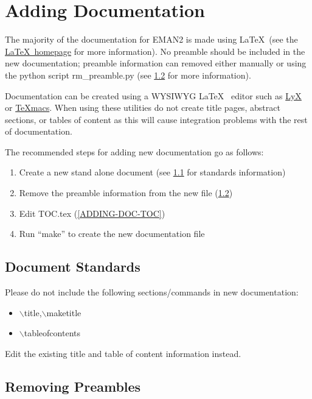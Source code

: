 \section{Adding Documentation} 

The majority of the documentation for EMAN2 is made using \LaTeX ~(see the
\href{http://www.latex-project.org/}{\LaTeX ~homepage} for more
information).  No preamble should be included in the new
documentation; preamble information can removed either manually or
using the python script rm\_preamble.py (see \ref{ADDING-DOC-RMPRE}
for more information).  

Documentation can be created using a WYSIWYG \LaTeX ~ editor such as
\href{http://www.lyx.org/}{LyX} or
\href{http://www.www.texmacs.org/}{TeXmacs}.  When using these
utilities do not create title pages, abstract sections, or tables of
content as this will cause integration problems with the rest of
documentation.

The recommended steps for adding new documentation go as follows:
\begin{enumerate}
  \item Create a new stand alone document (see \ref{ADDING-DOC-STANDS}
  for standards information)
  \item Remove the preamble information from the new file
  (\ref{ADDING-DOC-RMPRE})
  \item Edit TOC.tex (\ref{ADDING-DOC-TOC})
  \item Run ``make'' to create the new documentation file
\end{enumerate}

\subsection{Document Standards} \label{ADDING-DOC-STANDS}
Please do not include the following sections/commands in new documentation:
\begin{itemize}
  \item
    { $\backslash$title,$\backslash$maketitle}
  \item
    { $\backslash$tableofcontents}
\end{itemize}
Edit the existing title and table of content information instead.


\subsection{Removing Preambles} \label{ADDING-DOC-RMPRE}

